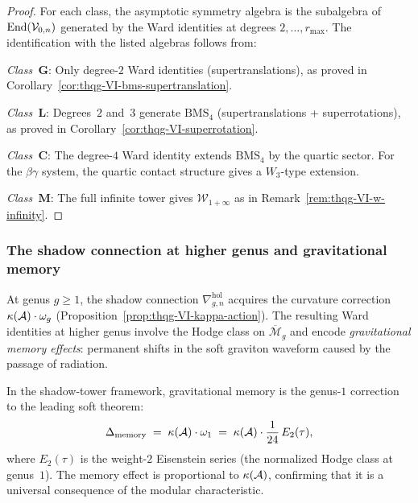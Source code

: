 \begin{proof}
For each class, the asymptotic symmetry algebra is the subalgebra
of $\operatorname{End}(\mathcal{V}_{0,n})$ generated by the Ward identities at degrees
$2, \dotsc, r_{\max}$. The identification with the listed algebras
follows from:

\emph{Class~$\mathbf{G}$}: Only degree-$2$ Ward identities
(supertranslations), as proved in
Corollary~\ref{cor:thqg-VI-bms-supertranslation}.

\emph{Class~$\mathbf{L}$}: Degrees~$2$ and~$3$ generate
$\mathrm{BMS}_4$ (supertranslations + superrotations), as proved
in Corollary~\ref{cor:thqg-VI-superrotation}.

\emph{Class~$\mathbf{C}$}: The degree-$4$ Ward identity extends
$\mathrm{BMS}_4$ by the quartic sector. For the $\beta\gamma$
system, the quartic contact structure gives a $W_3$-type extension.

\emph{Class~$\mathbf{M}$}: The full infinite tower gives
$\mathcal{W}_{1+\infty}$ as in
Remark~\ref{rem:thqg-VI-w-infinity}.
\end{proof}

\subsubsection{The shadow connection at higher genus and
gravitational memory}

\begin{remark}
\label{rem:thqg-VI-gravitational-memory}
At genus $g \geq 1$, the shadow connection
$\nabla^{\mathrm{hol}}_{g,n}$ acquires the curvature correction
$\kappa(\mathcal{A}) \cdot \omega_g$
(Proposition~\ref{prop:thqg-VI-kappa-action}). The resulting
Ward identities at higher genus involve the Hodge class on
$\overline{\mathcal{M}}_g$ and encode \emph{gravitational memory
effects}: permanent shifts in the soft graviton waveform caused
by the passage of radiation.

In the shadow-tower framework, gravitational memory is the
genus-$1$ correction to the leading soft theorem:
\begin{equation}\label{eq:thqg-VI-memory}
\Delta_{\mathrm{memory}}
\;=\;
\kappa(\mathcal{A}) \cdot \omega_1
\;=\;
\kappa(\mathcal{A}) \cdot \frac{1}{24}\,E_2(\tau),
\end{equation}
where $E_2(\tau)$ is the weight-$2$ Eisenstein series (the
normalized Hodge class at genus~$1$). The memory effect is
proportional to $\kappa(\mathcal{A})$, confirming that it is a universal
consequence of the modular characteristic.
\end{remark}


